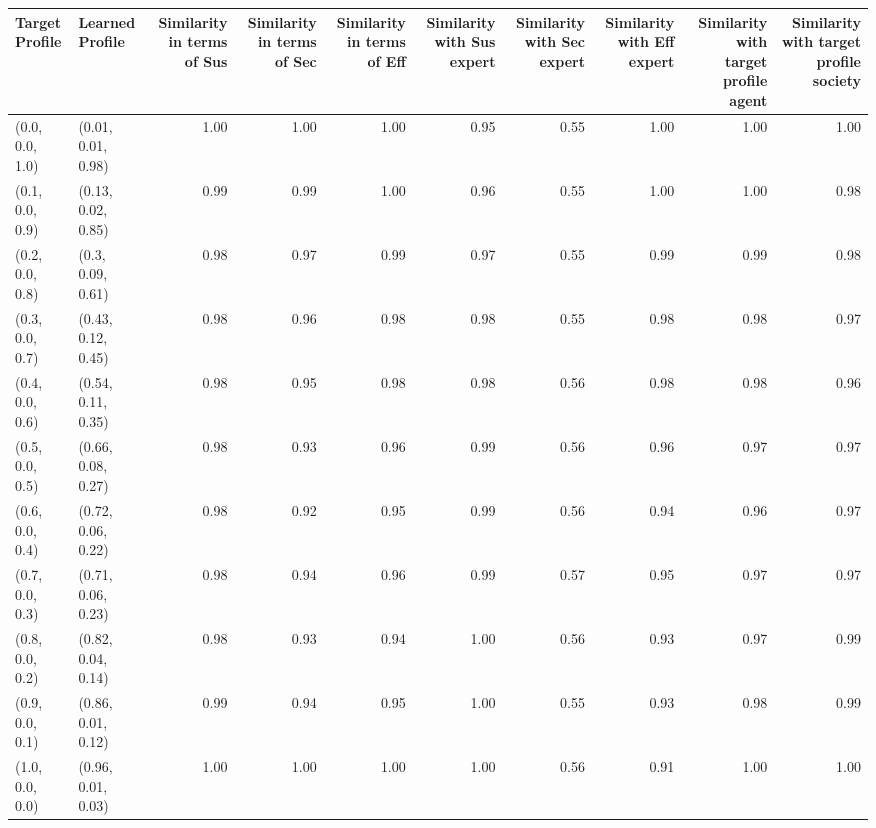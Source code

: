 \begin{tabular}{llrrrrrrrr}
\toprule
Target Profile & Learned Profile & Similarity in terms of Sus & Similarity in terms of Sec & Similarity in terms of Eff & Similarity with Sus expert & Similarity with Sec expert & Similarity with Eff expert & Similarity with target profile agent & Similarity with target profile society \\
\midrule
(0.0, 0.0, 1.0) & (0.01, 0.01, 0.98) & 1.00 & 1.00 & 1.00 & 0.95 & 0.55 & 1.00 & 1.00 & 1.00 \\
(0.1, 0.0, 0.9) & (0.13, 0.02, 0.85) & 0.99 & 0.99 & 1.00 & 0.96 & 0.55 & 1.00 & 1.00 & 0.98 \\
(0.2, 0.0, 0.8) & (0.3, 0.09, 0.61) & 0.98 & 0.97 & 0.99 & 0.97 & 0.55 & 0.99 & 0.99 & 0.98 \\
(0.3, 0.0, 0.7) & (0.43, 0.12, 0.45) & 0.98 & 0.96 & 0.98 & 0.98 & 0.55 & 0.98 & 0.98 & 0.97 \\
(0.4, 0.0, 0.6) & (0.54, 0.11, 0.35) & 0.98 & 0.95 & 0.98 & 0.98 & 0.56 & 0.98 & 0.98 & 0.96 \\
(0.5, 0.0, 0.5) & (0.66, 0.08, 0.27) & 0.98 & 0.93 & 0.96 & 0.99 & 0.56 & 0.96 & 0.97 & 0.97 \\
(0.6, 0.0, 0.4) & (0.72, 0.06, 0.22) & 0.98 & 0.92 & 0.95 & 0.99 & 0.56 & 0.94 & 0.96 & 0.97 \\
(0.7, 0.0, 0.3) & (0.71, 0.06, 0.23) & 0.98 & 0.94 & 0.96 & 0.99 & 0.57 & 0.95 & 0.97 & 0.97 \\
(0.8, 0.0, 0.2) & (0.82, 0.04, 0.14) & 0.98 & 0.93 & 0.94 & 1.00 & 0.56 & 0.93 & 0.97 & 0.99 \\
(0.9, 0.0, 0.1) & (0.86, 0.01, 0.12) & 0.99 & 0.94 & 0.95 & 1.00 & 0.55 & 0.93 & 0.98 & 0.99 \\
(1.0, 0.0, 0.0) & (0.96, 0.01, 0.03) & 1.00 & 1.00 & 1.00 & 1.00 & 0.56 & 0.91 & 1.00 & 1.00 \\
\bottomrule
\end{tabular}
